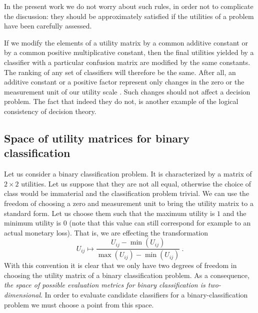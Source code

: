 \documentclass[\ifafour a4paper,12pt,\else a5paper,10pt,\fi%
onecolumn,oneside,article,%
british%
]{memoir}
\theoremstyle{remark}
\theoremstyle{innote}
\renewcommand*{\|}[1][]{\nonscript\:#1\vert\nonscript\:\mathopen{}}
\newcommand*{\sect}{\S}%
\begin{document}
In the present work we do not worry about such rules, in order not to complicate the discussion: they should be approximately satisfied if the utilities of a problem have been carefully assessed.

If we modify the elements of a utility matrix by a common additive constant or by a common positive multiplicative constant, then the final utilities yielded by a classifier with a particular confusion matrix are modified by the same constants. The ranking of any set of classifiers will therefore be the same. After all, an additive constant or a positive factor represent only changes in the zero or the measurement unit of our utility scale \autocites[cf.][\sect~15.2.2]{russelletal1995_r2022}. Such changes should not affect a decision problem. The fact that indeed they do not, is another example of the logical consistency of decision theory.

\subsection{Space of utility matrices for binary classification}
\label{sec:dt_space_util}

Let us consider a binary classification problem. It is characterized by a matrix of $2\times2$ utilities. Let us suppose that they are not all equal, otherwise the choice of class would be immaterial and the classification problem trivial. We can use the freedom of choosing a zero and measurement unit to bring the utility matrix to a standard form. Let us choose them such that the maximum utility is $1$ and  the minimum utility is $0$ (note that this value can still correspond for example to an actual monetary loss). That is, we are effecting the transformation
\begin{equation}
  \label{eq:normalize_utilities}
  U_{ij} \mapsto \frac{U_{ij} - \min(U_{ij})}{\max(U_{ij}) - \min(U_{ij})} \ .
\end{equation}
With this convention it is clear that we only have two degrees of freedom in choosing the utility matrix of a binary classification problem. As a consequence, \emph{the space of possible evaluation metrics for binary classification is two-dimensional}. In order to evaluate candidate classifiers for a binary-classification problem we must choose a point from this space.
\end{document}
